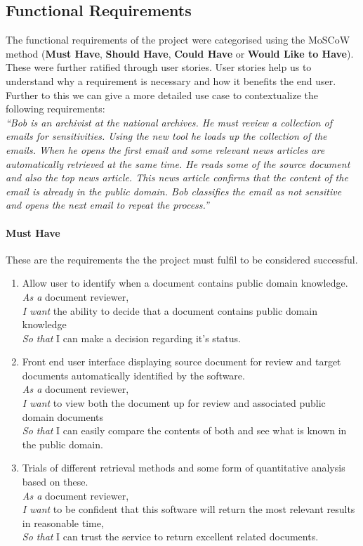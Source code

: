 \documentclass{l4proj}
\begin{document}
\subsection{Functional Requirements}
The functional requirements of the project were categorised using the MoSCoW method (\textbf{Must Have}, \textbf{Should Have}, \textbf{Could Have} or \textbf{Would Like to Have}). These were further ratified through user stories. User stories help us to understand why a requirement is necessary and how it benefits the end user. Further to this we can give a more detailed use case to contextualize the following requirements:\\ 
\textit{``Bob is an archivist at the national archives. He must review a collection of emails for sensitivities. Using the new tool he loads up the collection of the emails. When he opens the first email and some relevant news articles are automatically retrieved at the same time. He reads some of the source document and also the top news article. This news article confirms that the content of the email is already in the public domain. Bob classifies the email as not sensitive and opens the next email to repeat the process.''}
\paragraph{Must Have}
These are the requirements the the project must fulfil to be considered successful.
\begin{enumerate}[label=\textbf{M.\arabic*}]
\item Allow user to identify when a document contains public domain knowledge. \\
\textit{As a} document reviewer, \\
\textit{I want} the ability to decide that a document contains public domain knowledge \\
\textit{So that} I can make a decision regarding it's status. \\
\item Front end user interface displaying source document for review and target documents automatically identified by the software. \\
\textit{As a} document reviewer, \\
\textit{I want} to view both the document up for review and associated public domain documents \\
\textit{So that} I can easily compare the contents of both and see what is known in the public domain.
\item Trials of different retrieval methods and some form of quantitative analysis based on these. \\
\textit{As a} document reviewer, \\
\textit{I want} to be confident that this software will return the most relevant results in reasonable time, \\
\textit{So that} I can trust the service to return excellent related documents.
\end{enumerate}
\end{document}
